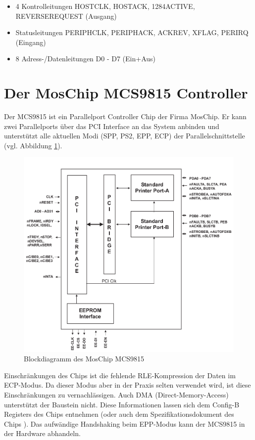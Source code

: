 \documentclass[a4paper,11pt]{article}
\begin{document}
\begin{itemize}
\item 4 Kontrolleitungen HOSTCLK, HOSTACK, 1284ACTIVE, REVERSEREQUEST (Ausgang)
\item Statusleitungen PERIPHCLK, PERIPHACK, ACKREV, XFLAG, PERIRQ (Eingang)
\item 8 Adress-/Datenleitungen D0 - D7 (Ein+Aus) \end{itemize}


\section{Der MosChip MCS9815 Controller}

Der MCS9815 ist ein Parallelport Controller Chip der Firma MosChip. Er kann
zwei Parallelports über das PCI Interface an das System anbinden und unterstützt alle
aktuellen Modi (SPP, PS2, EPP, ECP) der Parallelschnittstelle (vgl. Abbildung \ref{fig:blockdiagramm_mcs9815}).

\begin{figure}[h!]
 \centering
 \includegraphics[bb=0 0 724 671,scale=0.5]{./pics/mcs9815_block_diagram.png}
 \caption{Blockdiagramm des MosChip MCS9815}
 \label{fig:blockdiagramm_mcs9815}
\end{figure}

Einschränkungen des Chips ist die fehlende RLE-Kompression der Daten im ECP-Modus. Da dieser Modus aber
in der Praxis selten verwendet wird, ist diese Einschränkungen zu vernachlässigen.
Auch DMA (Direct-Memory-Access) unterstützt der Baustein nicht. Diese Informationen lassen sich dem Config-B Registers des
Chips entnehmen (oder auch dem Spezifikationsdokument des Chips \cite{net:3}).
Das aufwändige Handshaking beim EPP-Modus kann der MCS9815 in der Hardware abhandeln.
\end{document}
